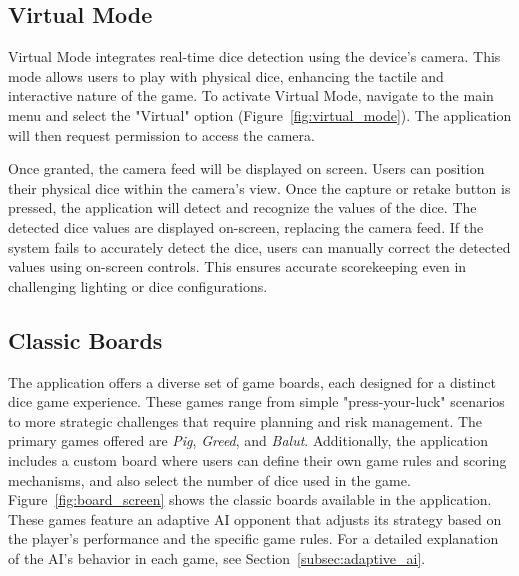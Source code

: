 \subsection{Virtual Mode}

Virtual Mode integrates real-time dice detection using the device's camera.  This mode allows users to play with physical dice, enhancing the tactile and interactive nature of the game.  To activate Virtual Mode, navigate to the main menu and select the "Virtual" option (Figure~\ref{fig:virtual_mode}).  The application will then request permission to access the camera.

Once granted, the camera feed will be displayed on screen. Users can position their physical dice within the camera's view. Once the capture or retake button is pressed, the application will detect and recognize the values of the dice.  The detected dice values are displayed on-screen, replacing the camera feed.  If the system fails to accurately detect the dice, users can manually correct the detected values using on-screen controls. This ensures accurate scorekeeping even in challenging lighting or dice configurations.

\subsection{Classic Boards}

The application offers a diverse set of game boards, each designed for a distinct dice game experience. These games range from simple "press-your-luck" scenarios to more strategic challenges that require planning and risk management. The primary games offered are \emph{Pig}, \emph{Greed}, and \emph{Balut}. Additionally, the application includes a custom board where users can define their own game rules and scoring mechanisms, and also select the number of dice used in the game.  Figure~\ref{fig:board_screen} shows the classic boards available in the application.  These games feature an adaptive AI opponent that adjusts its strategy based on the player's performance and the specific game rules.  For a detailed explanation of the AI's behavior in each game, see Section~\ref{subsec:adaptive_ai}.

